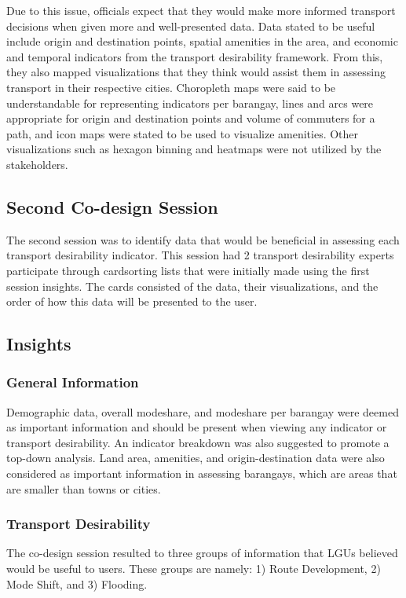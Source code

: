 \documentclass{sigchi}
\begin{document}
Due to this issue, officials expect that they would make more informed transport decisions when given more and well-presented data. Data stated to be useful include origin and destination points, spatial amenities in the area, and economic and temporal indicators from the transport desirability framework. From this, they also mapped visualizations that they think would assist them in assessing transport in their respective cities. Choropleth maps were said to be understandable for representing indicators per barangay, lines and arcs were appropriate for origin and destination points and volume of commuters for a path, and icon maps were stated to be used to visualize amenities. Other visualizations such as hexagon binning and heatmaps were not utilized by the stakeholders.

\subsection{Second Co-design Session}
The second session was to identify data that would be beneficial in assessing each transport desirability indicator. This session had 2 transport desirability experts participate through cardsorting lists that were initially made using the first session insights. The cards consisted of the data, their visualizations, and the order of how this data will be presented to the user.

\subsection{Insights}
\subsubsection{General Information}
Demographic data, overall modeshare, and modeshare per barangay were deemed as important information and should be present when viewing any indicator or transport desirability. An indicator breakdown was also suggested to promote a top-down analysis. Land area, amenities, and origin-destination data were also considered as important information in assessing barangays, which are areas that are smaller than towns or cities. 

\subsubsection{Transport Desirability}
The co-design session resulted to three groups of information that LGUs believed would be useful to users. These groups are namely: 1) Route Development, 2) Mode Shift, and 3) Flooding. 
\end{document}
